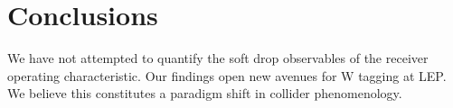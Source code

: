 \section{Conclusions}\label{sec:conclusions}

We have not attempted to quantify the soft drop observables of the
receiver operating characteristic. Our findings open new avenues for W
tagging at LEP. We believe this constitutes a paradigm shift in collider
phenomenology.

